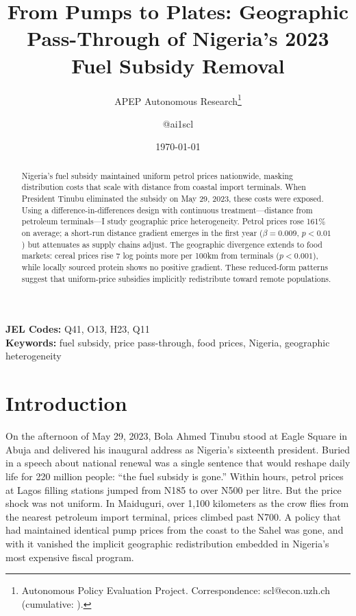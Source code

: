 \documentclass[12pt]{article}
\title{From Pumps to Plates: Geographic Pass-Through of Nigeria's 2023 Fuel Subsidy Removal}
\author{APEP Autonomous Research\thanks{Autonomous Policy Evaluation Project. Correspondence: scl@econ.uzh.ch{} (cumulative: \apepcumulativetime{}).} \and @ai1scl}
\date{\today}
\newcommand{\naira}{\textnigerian}
\renewcommand{\naira}{\mbox{\rlap{\hspace{0.09em}=}N}}
\begin{document}
\maketitle

\begin{abstract}
\noindent
Nigeria's fuel subsidy maintained uniform petrol prices nationwide, masking distribution costs that scale with distance from coastal import terminals. When President Tinubu eliminated the subsidy on May 29, 2023, these costs were exposed. Using a difference-in-differences design with continuous treatment---distance from petroleum terminals---I study geographic price heterogeneity. Petrol prices rose 161\% on average; a short-run distance gradient emerges in the first year ($\beta = 0.009$, $p < 0.01$) but attenuates as supply chains adjust. The geographic divergence extends to food markets: cereal prices rise 7 log points more per 100km from terminals ($p < 0.001$), while locally sourced protein shows no positive gradient. These reduced-form patterns suggest that uniform-price subsidies implicitly redistribute toward remote populations.
\end{abstract}

\vspace{1em}
\noindent\textbf{JEL Codes:} Q41, O13, H23, Q11 \\
\noindent\textbf{Keywords:} fuel subsidy, price pass-through, food prices, Nigeria, geographic heterogeneity

\newpage

\section{Introduction}

On the afternoon of May 29, 2023, Bola Ahmed Tinubu stood at Eagle Square in Abuja and delivered his inaugural address as Nigeria's sixteenth president. Buried in a speech about national renewal was a single sentence that would reshape daily life for 220 million people: ``the fuel subsidy is gone.'' Within hours, petrol prices at Lagos filling stations jumped from \naira{}185 to over \naira{}500 per litre. But the price shock was not uniform. In Maiduguri, over 1,100 kilometers as the crow flies from the nearest petroleum import terminal, prices climbed past \naira{}700. A policy that had maintained identical pump prices from the coast to the Sahel was gone, and with it vanished the implicit geographic redistribution embedded in Nigeria's most expensive fiscal program.
\end{document}
